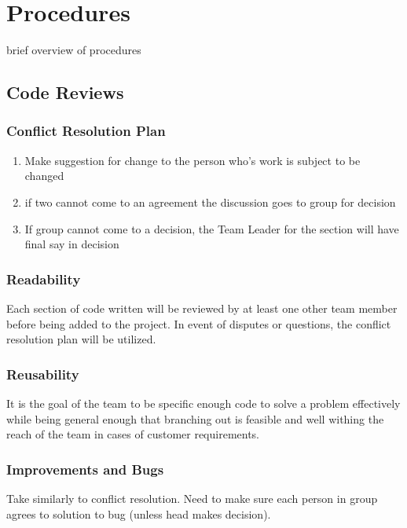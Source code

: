 \documentclass[11pt, titlepage]{article}
\begin{document}
    \section{Procedures}
    	\tab brief overview of procedures
    \subsection{Code Reviews}
   		\subsubsection{Conflict Resolution Plan}

        \begin{enumerate}
				\item Make suggestion for change to the person who's work is subject to be 	changed
        \item if two cannot come to an agreement the discussion goes to group for 	decision
        \item If group cannot come to a decision, the Team Leader for the section will have final say in decision
		\end{enumerate}

    \subsubsection{Readability}
	    Each section of code written will be reviewed by at least one other team member before being added to the project.  In event of disputes or questions, the conflict resolution plan will be utilized.
    \subsubsection{Reusability}
	    It is the goal of the team to be specific enough code to solve a problem effectively while being general enough that branching out is feasible and well withing the reach of the team in cases of customer requirements.

    \subsubsection{Improvements and Bugs}

    	Take similarly to conflict resolution.  Need to make sure each person in group agrees to solution to bug (unless head makes decision).
\end{document}
